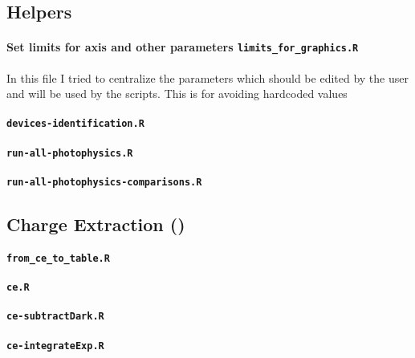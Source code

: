 \subsection{Helpers}
\paragraph{Set limits for axis and other parameters \texttt{limits_for_graphics.R}}
In this file I tried to centralize the parameters which should be edited by the user and will be used by the scripts.
This is for avoiding hardcoded values 

\paragraph{\texttt{devices-identification.R}}

\paragraph{\texttt{run-all-photophysics.R}}
\paragraph{\texttt{run-all-photophysics-comparisons.R}}


\subsection{Charge Extraction ()}\label{r_ce}

\paragraph{\texttt{from_ce_to_table.R}}
\paragraph{\texttt{ce.R}}
\paragraph{\texttt{ce-subtractDark.R}}
\paragraph{\texttt{ce-integrateExp.R}}
